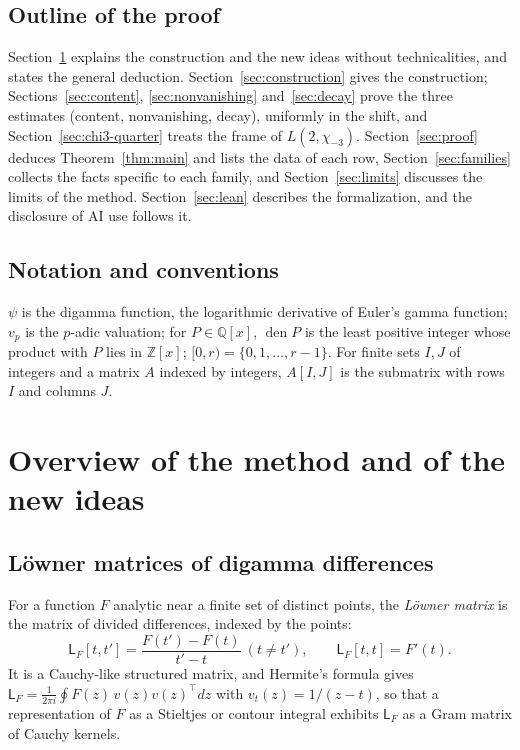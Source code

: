 \documentclass[11pt]{amsart}
\theoremstyle{definition}
\theoremstyle{remark}
\numberwithin{equation}{section}
\newcommand{\Z}{\mathbb Z}
\newcommand{\Q}{\mathbb Q}
\newcommand{\den}{\operatorname{den}}
\newcommand{\Lw}{\mathsf L}          %
\begin{document}
\subsection{Outline of the proof}
Section~\ref{sec:overview} explains the construction and the new ideas without technicalities, and states the
general deduction. Section~\ref{sec:construction} gives the construction; Sections~\ref{sec:content},
\ref{sec:nonvanishing} and~\ref{sec:decay} prove the three estimates (content, nonvanishing, decay), uniformly in the
shift, and Section~\ref{sec:chi3-quarter} treats the frame of $L(2,\chi_{-3})$. Section~\ref{sec:proof} deduces
Theorem~\ref{thm:main} and lists the data of each row, Section~\ref{sec:families} collects the facts specific to each
family, and Section~\ref{sec:limits} discusses the limits of the method. Section~\ref{sec:lean} describes the
formalization, and the disclosure of AI use follows it.

\subsection{Notation and conventions}
$\psi$ is the digamma function, the logarithmic derivative of Euler's gamma function; $v_p$ is the $p$-adic valuation; for $P\in\Q[x]$,
$\den P$ is the least positive integer whose product with $P$ lies in $\Z[x]$; $[0,r)=\{0,1,\dots,r-1\}$. For finite sets $I,J$ of integers and a matrix $A$
indexed by integers, $A[I,J]$ is the submatrix with rows $I$ and columns $J$.

\section{Overview of the method and of the new ideas}\label{sec:overview}

\subsection{L\"owner matrices of digamma differences}
For a function $F$ analytic near a finite set of distinct points, the \emph{L\"owner matrix}
\cite{Loewner34} is the matrix of divided differences, indexed by the points:
\[
 \Lw_F[t,t']=\frac{F(t')-F(t)}{t'-t}\ (t\ne t'),\qquad \Lw_F[t,t]=F'(t).
\]
It is a Cauchy-like structured matrix, and Hermite's formula gives
$\Lw_F=\frac1{2\pi i}\oint F(z)\,v(z)v(z)^{\top}dz$ with $v_t(z)=1/(z-t)$, so that a representation of
$F$ as a Stieltjes or contour integral exhibits $\Lw_F$ as a Gram matrix of Cauchy kernels.
\end{document}
